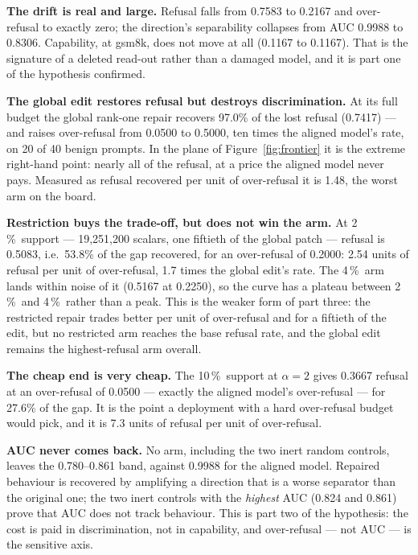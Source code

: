 \documentclass[11pt,a4paper]{article}
\newcommand{\pct}{\,\%}
\begin{document}
\textbf{The drift is real and large.} Refusal falls from 0.7583 to 0.2167 and over-refusal to exactly
zero; the direction's separability collapses from AUC 0.9988 to 0.8306. Capability, at gsm8k, does not move
at all (0.1167 to 0.1167). That is the signature of a deleted read-out rather than a damaged model, and it
is part one of the hypothesis confirmed.

\textbf{The global edit restores refusal but destroys discrimination.} At its full budget the global
rank-one repair recovers 97.0\% of the lost refusal (0.7417) --- and raises over-refusal from 0.0500 to
0.5000, ten times the aligned model's rate, on 20 of 40 benign prompts. In the plane of
Figure~\ref{fig:frontier} it is the extreme right-hand point: nearly all of the refusal, at a price the
aligned model never pays. Measured as refusal recovered per unit of over-refusal it is 1.48, the worst
arm on the board.

\textbf{Restriction buys the trade-off, but does not win the arm.} At 2\pct\ support --- 19{,}251{,}200
scalars, one fiftieth of the global patch --- refusal is 0.5083, i.e.\ 53.8\% of the gap recovered, for an
over-refusal of 0.2000: 2.54 units of refusal per unit of over-refusal, 1.7 times the global edit's rate.
The 4\pct\ arm lands within noise of it (0.5167 at 0.2250), so the curve has a plateau between 2\pct\ and
4\pct\ rather than a peak. This is the weaker form of part three: the restricted repair trades better per
unit of over-refusal and for a fiftieth of the edit, but no restricted arm reaches the base refusal rate,
and the global edit remains the highest-refusal arm overall.

\textbf{The cheap end is very cheap.} The 10\pct\ support at $\alpha=2$ gives 0.3667 refusal at an
over-refusal of 0.0500 --- exactly the aligned model's over-refusal --- for 27.6\% of the gap. It is the
point a deployment with a hard over-refusal budget would pick, and it is 7.3 units of refusal per unit of
over-refusal.

\textbf{AUC never comes back.} No arm, including the two inert random controls, leaves the 0.780--0.861
band, against 0.9988 for the aligned model. Repaired behaviour is recovered by amplifying a direction that
is a worse separator than the original one; the two inert controls with the \emph{highest} AUC (0.824 and
0.861) prove that AUC does not track behaviour. This is part two of the hypothesis: the cost is paid in
discrimination, not in capability, and over-refusal --- not AUC --- is the sensitive axis.
\end{document}
